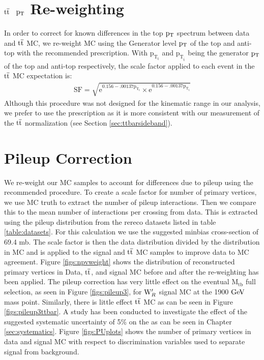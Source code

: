 \section{$\mathrm{t\overline{t}}$ $\mathrm{p_{T}}$ Re-weighting}
\label{sec:ttptrw}
In order to correct for known differences in the top $\mathrm{p_{T}}$ spectrum between data and $\mathrm{t\overline{t}}$ MC, we re-weight MC using the Generator level $\mathrm{p_{T}}$ of the top and anti-top with the recommended prescription.  
With $\mathrm{p_{T_{t}}}$ and $\mathrm{p_{T_{\overline{t}}}}$ being the generator $\mathrm{p_{T}}$ of the top and anti-top respectively, the scale factor applied to each event in the $\mathrm{t\overline{t}}$ MC expectation is:
\begin{eqnarray}
\mathrm{SF =\sqrt{e^{0.156-.00137p_{T_{t}}} \times e^{0.156-.00137p_{T_{\overline{t}}}}}}
\end{eqnarray}
Although this procedure was not designed for the kinematic range in our analysis, 
we prefer to use the prescription as it is more consistent with our measurement of the $\mathrm{t\overline{t}}$ normalization (see Section \ref{sec:ttbarsideband}).


\section{Pileup Correction}
\label{sec:pileup}
We re-weight our MC samples to account for differences due to pileup using the recommended procedure.  
To create a scale factor for number of primary vertices, we use MC truth to extract the number of pileup interactions.  
Then we compare this to the mean number of interactions per crossing from data.  
This is extracted using the pileup distribution from the rereco datasets listed in table \ref{table:datasets}.  
For this calculation we use the suggested minbias cross-section of 69.4 mb.  The scale factor is then 
the data distribution divided by the distribution in MC and is applied to the signal and $\mathrm{t\overline{t}}$ MC samples to improve 
data to MC agreement.
Figure \ref{figs:npvweight} shows the distribution of reconstructed primary vertices in Data, $\mathrm{t\overline{t}}$,
and signal MC before and after the re-weighting has been applied. The pileup correction has very little effect on the eventual $\mathrm{M_{tb}}$ full selection, as 
seen in Figure \ref{figs:pileup3}, for $\mathrm{W}^\prime_R$ signal MC at the 1900$~\mathrm{GeV}$ mass point. Similarly, there is little effect 
$\mathrm{t\overline{t}}$ MC as can be seen in Figure \ref{figs:pileup3ttbar}.  
A study has been conducted to investigate the effect of the suggested systematic uncertainty of 5\% on the  as can be seen in Chapter \ref{sec:systematics}.  
Figure \ref{figs:PUplots} shows the number of primary vertices in data and signal MC with respect to discrimination variables used to separate signal from background.


